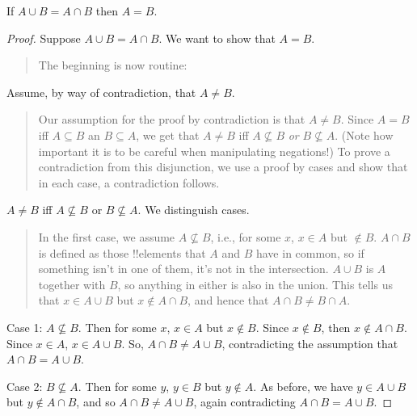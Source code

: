 \documentclass[../../../include/open-logic-section]{subfiles}
\begin{document}
\begin{prop}
If $A \cup B = A \cap B$ then $A = B$.
\end{prop}

\begin{proof}
  Suppose $A \cup B = A \cap B$. We want to show that $A = B$.
  \begin{quote}
    The beginning is now routine:
  \end{quote}
  Assume, by way of contradiction, that $A \neq B$.
  \begin{quote}
    Our assumption for the proof by contradiction is that $A \neq
    B$. Since $A = B$ iff $A \subseteq B$ an $B \subseteq A$, we get
    that $A \neq B$ iff $A \nsubseteq B$ \emph{or} $B \nsubseteq
    A$. (Note how important it is to be careful when manipulating
    negations!{}) To prove a contradiction from this disjunction, we
    use a proof by cases and show that in each case, a contradiction
    follows.
  \end{quote}
  $A \neq B$ iff $A \nsubseteq B$ or $B \nsubseteq A$. We distinguish
  cases.
  \begin{quote}
    In the first case, we assume $A \nsubseteq B$, i.e., for some $x$,
    $x \in A$ but $\notin B$. $A \cap B$ is defined as those
    !!{element}s that $A$ and $B$ have in common, so if something
    isn't in one of them, it's not in the intersection. $A \cup B$ is
    $A$ together with $B$, so anything in either is also in the
    union. This tells us that $x \in A \cup B$ but $x \notin A \cap
    B$, and hence that $A \cap B \neq B \cap A$.
  \end{quote}
  
  Case 1: $A \nsubseteq B$. Then for some $x$, $x \in A$ but $x \notin
  B$. Since $x \notin B$, then $x \notin A \cap B$. Since $x \in A$,
  $x \in A \cup B$. So, $A \cap B \neq A \cup B$, contradicting the
  assumption that $A \cap B = A \cup B$.

  Case 2: $B \nsubseteq A$. Then for some $y$, $y \in B$ but $y \notin
  A$. As before, we have $y \in A \cup B$ but $y \notin A \cap B$, and
  so $A \cap B \neq A \cup B$, again contradicting $A \cap B = A \cup
  B$. 
\end{proof}
\end{document}
